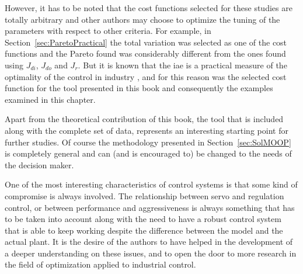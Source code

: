 However, it has to be noted that the cost functions selected for these studies are totally arbitrary and other authors may choose to optimize the tuning of the parameters with respect to other criteria. For example, in Section~\ref{sec:ParetoPractical} the total variation was selected as one of the cost functions and the Pareto found was considerably different from the ones found using $J_{di}$, $J_{do}$ and $J_r$. But it is known that the \gls{iae} is a practical measure of the optimality of the control in industry \citep{Shinskey2002}, and for this reason was the selected cost function for the tool presented in this book and consequently the examples examined in this chapter.

Apart from the theoretical contribution of this book, the \matlab{} tool that is included along with the complete set of data, represents an interesting starting point for further studies. Of course the methodology presented in Section~\ref{sec:SolMOOP} is completely general and can (and is encouraged to) be changed to the needs of the decision maker.

One of the most interesting characteristics of control systems is that some kind of compromise is always involved. The relationship between servo and regulation control, or between performance and aggressiveness is always something that has to be taken into account along with the need to have a robust control system that is able to keep working despite the difference between the model and the actual plant. It is the desire of the authors to have helped in the development of a deeper understanding on these issues, and to open the door to more research in the field of optimization applied to industrial control.


